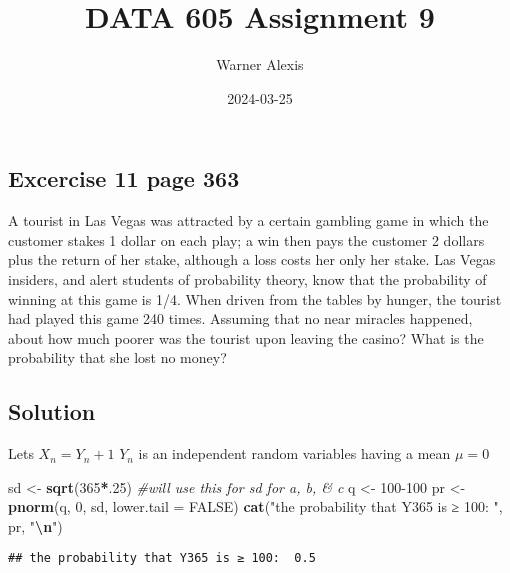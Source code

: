 \documentclass[
]{article}
\title{DATA 605 Assignment 9}
\author{Warner Alexis}
\date{2024-03-25}
\newenvironment{Shaded}{\begin{snugshade}}{\end{snugshade}}
\newcommand{\AttributeTok}[1]{\textcolor[rgb]{0.13,0.29,0.53}{#1}}
\newcommand{\CommentTok}[1]{\textcolor[rgb]{0.56,0.35,0.01}{\textit{#1}}}
\newcommand{\ConstantTok}[1]{\textcolor[rgb]{0.56,0.35,0.01}{#1}}
\newcommand{\DecValTok}[1]{\textcolor[rgb]{0.00,0.00,0.81}{#1}}
\newcommand{\FunctionTok}[1]{\textcolor[rgb]{0.13,0.29,0.53}{\textbf{#1}}}
\newcommand{\NormalTok}[1]{#1}
\newcommand{\OtherTok}[1]{\textcolor[rgb]{0.56,0.35,0.01}{#1}}
\newcommand{\SpecialCharTok}[1]{\textcolor[rgb]{0.81,0.36,0.00}{\textbf{#1}}}
\newcommand{\StringTok}[1]{\textcolor[rgb]{0.31,0.60,0.02}{#1}}
\begin{document}
\maketitle

\hypertarget{excercise-11-page-363}{%
\subsection{Excercise 11 page 363}\label{excercise-11-page-363}}

A tourist in Las Vegas was attracted by a certain gambling game in which
the customer stakes 1 dollar on each play; a win then pays the customer
2 dollars plus the return of her stake, although a loss costs her only
her stake. Las Vegas insiders, and alert students of probability theory,
know that the probability of winning at this game is 1/4. When driven
from the tables by hunger, the tourist had played this game 240 times.
Assuming that no near miracles happened, about how much poorer was the
tourist upon leaving the casino? What is the probability that she lost
no money?

\hypertarget{solution}{%
\subsection{Solution}\label{solution}}

Lets \(X_n = Y_n + 1\) \(Y_n\) is an independent random variables having
a mean \(\mu = 0\)

\begin{Shaded}
\begin{Highlighting}[]
\NormalTok{sd }\OtherTok{\textless{}{-}} \FunctionTok{sqrt}\NormalTok{(}\DecValTok{365}\SpecialCharTok{*}\NormalTok{.}\DecValTok{25}\NormalTok{) }\CommentTok{\#will use this for sd for a, b, \& c}
\NormalTok{q }\OtherTok{\textless{}{-}} \DecValTok{100{-}100}
\NormalTok{pr  }\OtherTok{\textless{}{-}} \FunctionTok{pnorm}\NormalTok{(q, }\DecValTok{0}\NormalTok{, sd, }\AttributeTok{lower.tail =} \ConstantTok{FALSE}\NormalTok{)}
\FunctionTok{cat}\NormalTok{(}\StringTok{"the probability that Y365 is ≥ 100: "}\NormalTok{, pr, }\StringTok{"}\SpecialCharTok{\textbackslash{}n}\StringTok{"}\NormalTok{)}
\end{Highlighting}
\end{Shaded}

\begin{verbatim}
## the probability that Y365 is ≥ 100:  0.5
\end{verbatim}
\end{document}
